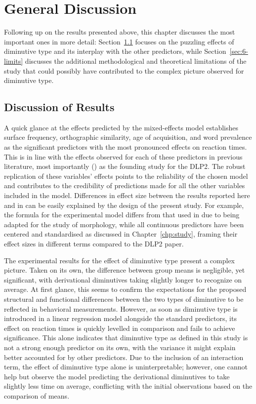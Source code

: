 \chapter{General Discussion}\label{chp:discussion}
Following up on the results presented above, this chapter discusses the most important ones in more detail: Section~\ref{sec:6-disc} focuses on the puzzling effects of diminutive type and its interplay with the other predictors, while Section~\ref{sec:6-limits} discusses the additional methodological and theoretical limitations of the study that could possibly have contributed to the complex picture observed for diminutive type.

\section{Discussion of Results}
\label{sec:6-disc}
A quick glance at the effects predicted by the mixed-effects model establishes surface frequency, orthographic similarity, age of acquisition, and word prevalence as the significant predictors with the most pronounced effects on reaction times. This is in line with the effects observed for each of these predictors in previous literature, most importantly \citeauthor{Brysbaert+etal+2016} (\citeyear{Brysbaert+etal+2016}) as the founding study for the DLP2. The robust replication of these variables' effects points to the reliability of the chosen model and contributes to the credibility of predictions made for all the other variables included in the model. Differences in effect size between the results reported here and in \citeauthor{Brysbaert+etal+2016} can be easily explained by the design of the present study. For example, the formula for the experimental model differs from that used in \citeauthor{Brysbaert+etal+2016} due to being adapted for the study of morphology, while all continuous predictors have been centered and standardised as discussed in Chapter~\ref{chp:study}, framing their effect sizes in different terms compared to the DLP2 paper.

The experimental results for the effect of diminutive type present a complex picture. Taken on its own, the difference between group means is negligible, yet significant, with derivational diminutives taking slightly longer to recognize on average. At first glance, this seems to confirm the expectations for the proposed structural and functional differences between the two types of diminutive to be reflected in behavioral measurements. However, as soon as diminutive type is introduced in a linear regression model alongside the standard predictors, its effect on reaction times is quickly levelled in comparison and fails to achieve significance. This alone indicates that diminutive type as defined in this study is not a strong enough predictor on its own, with the variance it might explain better accounted for by other predictors. Due to the inclusion of an interaction term, the effect of diminutive type alone is uninterpretable; however, one cannot help but observe the model predicting the derivational diminutives to take slightly less time on average, conflicting with the initial observations based on the comparison of means.

